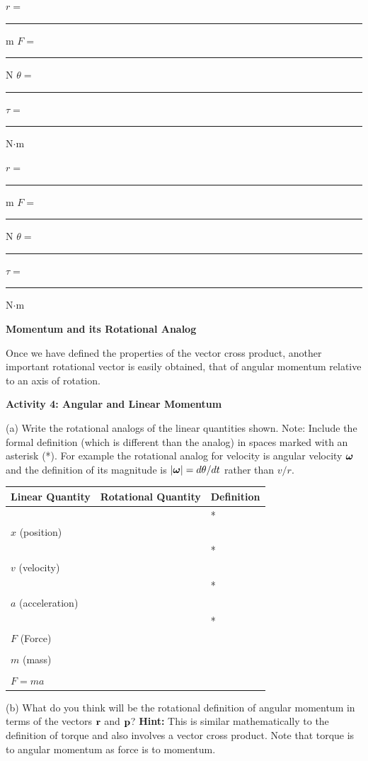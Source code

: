 $r =$ \rule{0.5in}{0.1pt} m \hfill{}$F =$ 
\rule{0.5in}{0.1pt} N \hfill{}\( \theta  =\)
 \rule{0.5in}{0.1pt} \hfill{}\( \tau  =\)  \rule{0.5in}{0.1pt} N\( \cdot  \)m 
\vspace{5mm}

$r = $\rule{0.5in}{0.1pt} m \hfill{}$F =$ \rule{0.5in}{0.1pt} N \hfill{}
\( \theta = \)
\rule{0.5in}{0.1pt} \hfill{}\( \tau  =\)  \rule{0.5in}{0.1pt} N\( \cdot  \)m
\vspace{5mm}

\textbf{Momentum and its Rotational Analog} 

Once we have defined the properties of the vector cross product, another important
rotational vector is easily obtained, that of angular momentum relative to an
axis of rotation. 

\textbf{Activity 4: Angular and Linear Momentum }

(a) Write the rotational analogs of the linear quantities shown. Note: Include
the formal definition (which is different than the analog) in spaces marked
with an asterisk ({*}). For example the rotational analog for velocity is angular
velocity \( \mbox{\boldmath$\omega$}  \) and the definition of its magnitude is \( |
\mbox{\boldmath$\omega$}  |
= d \theta  /dt\) rather than $v/r$.

\vspace{0.3cm}
{\centering \begin{tabular}{|p{5cm}|p{5cm}|p{5cm}|}
\hline 
Linear Quantity&
Rotational Quantity&
Definition\\
\hline 
\hline 
&
&
{*}\\
$x$ (position) &
&
\\
\hline 
&
&
{*}\\
$v$ (velocity) &
&
\\
\hline 
&
&
{*}\\
$a$ (acceleration) &
&
\\
\hline 
&
&
{*}\\
$F$ (Force) &
&
\\
\hline 
&
&
\\
$m$ (mass) &
&
\\
\hline 
&
&
\\
$F = ma$&
&
\\
\hline 
\end{tabular}\par}
\vspace{0.3cm}

(b) What do you think will be the rotational definition of angular momentum
in terms of the vectors \( {\bf r} \) and \( {\bf p} \)?
\textbf{Hint:} This is similar mathematically to the definition of torque and
also involves a vector cross product. Note that torque is to angular momentum
as force is to momentum.
\vspace{20mm}

